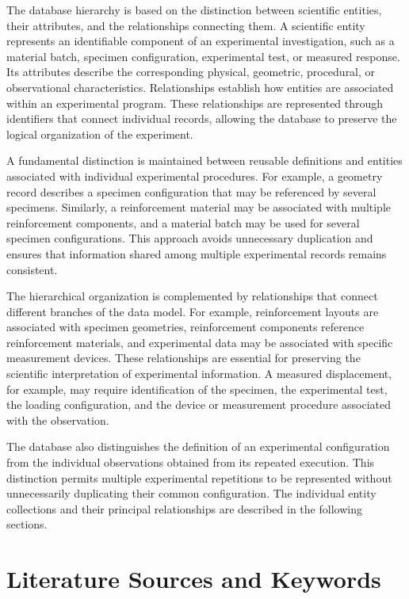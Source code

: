 The database hierarchy is based on the distinction
between scientific entities, their attributes,
and the relationships connecting them.
A scientific entity represents an identifiable
component of an experimental investigation,
such as a material batch, specimen configuration,
experimental test, or measured response.
Its attributes describe the corresponding
physical, geometric, procedural, or observational
characteristics.
Relationships establish how entities are
associated within an experimental program.
These relationships are represented through
identifiers that connect individual records,
allowing the database to preserve the logical
organization of the experiment.

A fundamental distinction is maintained between
reusable definitions and entities associated
with individual experimental procedures.
For example, a geometry record describes
a specimen configuration that may be referenced
by several specimens. Similarly, a reinforcement
material may be associated with multiple
reinforcement components, and a material batch
may be used for several specimen configurations.
This approach avoids unnecessary duplication
and ensures that information shared among
multiple experimental records remains consistent.

The hierarchical organization is complemented
by relationships that connect different branches
of the data model. For example, reinforcement
layouts are associated with specimen geometries,
reinforcement components reference reinforcement
materials, and experimental data may be
associated with specific measurement devices.
These relationships are essential for preserving
the scientific interpretation of experimental
information. A measured displacement, for example,
may require identification of the specimen,
the experimental test, the loading configuration,
and the device or measurement procedure
associated with the observation.

The database also distinguishes the definition
of an experimental configuration from the
individual observations obtained from its
repeated execution. This distinction permits
multiple experimental repetitions to be
represented without unnecessarily duplicating
their common configuration.
The individual entity collections and their
principal relationships are described in the
following sections.


\section{Literature Sources and Keywords}

